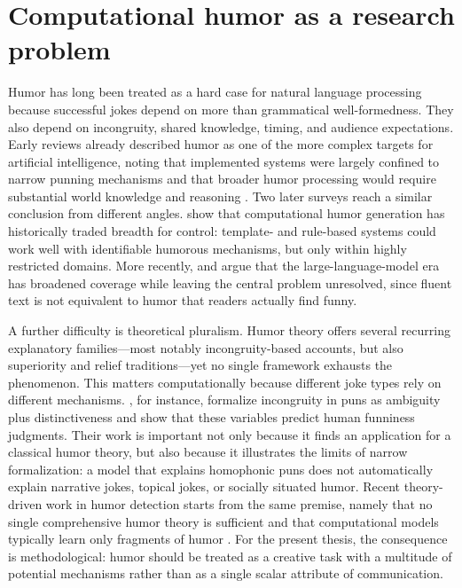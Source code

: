 
\section{Computational humor as a research problem}

Humor has long been treated as a hard case for natural language processing because successful jokes depend on more than grammatical well-formedness. They also depend on incongruity, shared knowledge, timing, and audience expectations. Early reviews already described humor as one of the more complex targets for artificial intelligence, noting that implemented systems were largely confined to narrow punning mechanisms and that broader humor processing would require substantial world knowledge and reasoning \citep{ritchie2001current}. Two later surveys reach a similar conclusion from different angles. \citet{amin2020survey} show that computational humor generation has historically traded breadth for control: template- and rule-based systems could work well with identifiable humorous mechanisms, but only within highly restricted domains. More recently, \citet{Loakman2025} and \citet{lemmens2026computational} argue that the large-language-model era has broadened coverage while leaving the central problem unresolved, since fluent text is not equivalent to humor that readers actually find funny.

A further difficulty is theoretical pluralism. Humor theory offers several recurring explanatory families---most notably incongruity-based accounts, but also superiority and relief traditions---yet no single framework exhausts the phenomenon. This matters computationally because different joke types rely on different mechanisms. \citet{kao2016computational}, for instance, formalize incongruity in puns as ambiguity plus distinctiveness and show that these variables predict human funniness judgments. Their work is important not only because it finds an application for a classical humor theory, but also because it illustrates the limits of narrow formalization: a model that explains homophonic puns does not automatically explain narrative jokes, topical jokes, or socially situated humor. Recent theory-driven work in humor detection starts from the same premise, namely that no single comprehensive humor theory is sufficient and that computational models typically learn only fragments of humor \citep{demarez2024thinc}. For the present thesis, the consequence is methodological: humor should be treated as a creative task with a multitude of potential mechanisms rather than as a single scalar attribute of communication.

